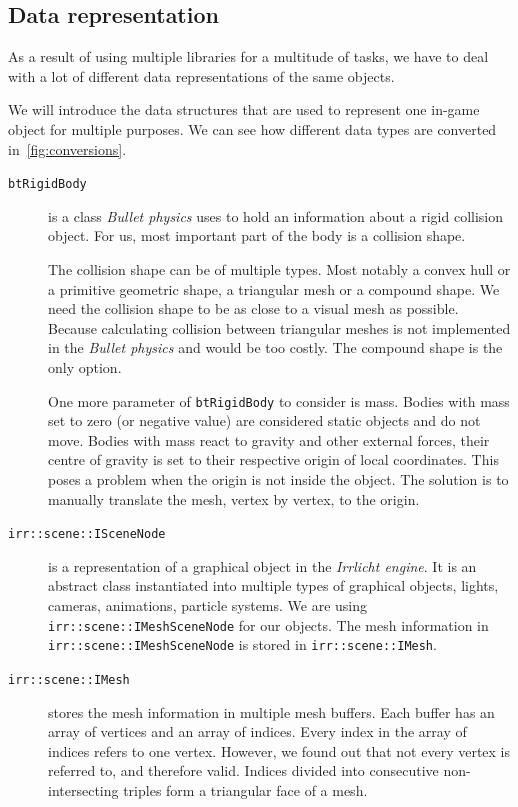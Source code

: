 \subsection{Data representation}
As a result of using multiple libraries for a multitude of tasks, we have to deal with a lot of different data representations of the same objects. 

We will introduce the data structures that are used to represent one in-game object for multiple purposes. We can see how different data types are converted in~\cref{fig:conversions}.
\begin{description}
\item [{\tt btRigidBody}] is a class \emph{Bullet physics} uses to hold an information about a rigid collision object. For us, most important part of the body is a collision shape.

The collision shape can be of multiple types. Most notably a convex hull or a primitive geometric shape, a triangular mesh or a compound shape. We need the collision shape to be as close to a visual mesh as possible. Because calculating collision between triangular meshes is not implemented in the \emph{Bullet physics} and would be too costly. The compound shape is the only option.

One more parameter of {\tt btRigidBody} to consider is mass. Bodies with mass set to zero (or negative value) are considered static objects and do not move. Bodies with mass react to gravity and other external forces, their centre of gravity is set to their respective origin of local coordinates. This poses a problem when the origin is not inside the object. The solution is to manually translate the mesh, vertex by vertex, to the origin.

\item [{\tt irr::scene::ISceneNode}] is a representation of a graphical object in the \emph{Irrlicht engine}. It is an abstract class instantiated into multiple types of graphical objects, \eg lights, cameras, animations, particle systems. We are using {\tt irr::scene::IMeshSceneNode} for our objects. The mesh information in {\tt irr::scene::IMeshSceneNode} is stored in {\tt irr::scene::IMesh}. 

\item [{\tt irr::scene::IMesh}] stores the mesh information in multiple mesh buffers. Each buffer has an array of vertices and an array of indices. Every index in the array of indices refers to one vertex. However, we found out that not every vertex is referred to, and therefore valid. Indices divided into consecutive non-intersecting triples form a triangular face of a mesh. 


\end{description}
